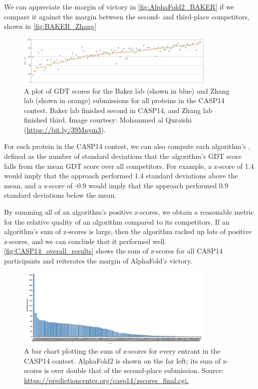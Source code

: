 We can appreciate the margin of victory in \autoref{fig:AlphaFold2_BAKER} if we compare it against the margin between the second- and third-place competitors, shown in \autoref{fig:BAKER_Zhang}\\

\begin{figure}[h]
	\centering
	\mySfFamily
	\includegraphics[width = 0.85\textwidth]{../images/BAKER_Zhang.png}
	\caption{A plot of GDT scores for the Baker lab (shown in blue) and Zhang lab (shown in orange) submissions for all proteins in the CASP14 contest. Baker lab finished second in CASP14, and Zhang lab finished third. Image courtesy: Mohammed al Quraishi (\url{https://bit.ly/39Mnym3}).}
	\label{fig:BAKER_Zhang}
\end{figure}

For each protein in the CASP14 contest, we can also compute each algorithm's , defined as the number of standard deviations that the algorithm's GDT score falls from the mean GDT score over all competitors. For example, a z-score of 1.4 would imply that the approach performed 1.4 standard deviations above the mean, and a z-score of -0.9 would imply that the approach performed 0.9 standard deviations below the mean.

By summing all of an algorithm's positive z-scores, we obtain a reasonable metric for the relative quality of an algorithm compared to its competitors. If an algorithm's sum of z-scores is large, then the algorithm racked up lots of positive z-scores, and we can conclude that it performed well. \autoref{fig:CASP14_overall_results} shows the sum of z-scores for all CASP14 participants and reiterates the margin of AlphaFold's victory.\\

\begin{figure}[h]
	\centering
	\mySfFamily
	\includegraphics[width = 0.85\textwidth]{../images/CASP14_overall_results.png}
	\caption{A bar chart plotting the sum of z-scores for every entrant in the CASP14 contest. AlphaFold2 is shown on the far left; its sum of z-scores is over double that of the second-place submission. Source: \url{https://predictioncenter.org/casp14/zscores_final.cgi.}}
	\label{fig:CASP14_overall_results}
\end{figure}

